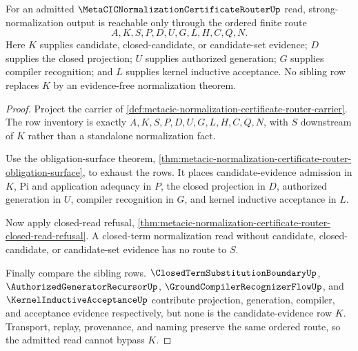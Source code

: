 \begin{theorem}
\label{thm:metacic-normalization-certificate-router-route-coverage}
For an admitted $\MetaCICNormalizationCertificateRouterUp$ read, strong-normalization output is reachable only through the ordered finite route
$$
A,K,S,P,D,U,G,L,H,C,Q,N.
$$
Here $K$ supplies candidate, closed-candidate, or candidate-set evidence; $D$ supplies the closed projection; $U$ supplies authorized generation; $G$ supplies compiler recognition; and $L$ supplies kernel inductive acceptance. No sibling row replaces $K$ by an evidence-free normalization theorem.
\end{theorem}
\begin{proof}
Project the carrier of \autoref{def:metacic-normalization-certificate-router-carrier}. The row inventory is exactly $A,K,S,P,D,U,G,L,H,C,Q,N$, with $S$ downstream of $K$ rather than a standalone normalization fact.

Use the obligation-surface theorem, \autoref{thm:metacic-normalization-certificate-router-obligation-surface}, to exhaust the rows. It places candidate-evidence admission in $K$, Pi and application adequacy in $P$, the closed projection in $D$, authorized generation in $U$, compiler recognition in $G$, and kernel inductive acceptance in $L$.

Now apply closed-read refusal, \autoref{thm:metacic-normalization-certificate-router-closed-read-refusal}. A closed-term normalization read without candidate, closed-candidate, or candidate-set evidence has no route to $S$.

Finally compare the sibling rows. $\ClosedTermSubstitutionBoundaryUp$, $\AuthorizedGeneratorRecursorUp$, $\GroundCompilerRecognizerFlowUp$, and $\KernelInductiveAcceptanceUp$ contribute projection, generation, compiler, and acceptance evidence respectively, but none is the candidate-evidence row $K$. Transport, replay, provenance, and naming preserve the same ordered route, so the admitted read cannot bypass $K$.
\end{proof}

